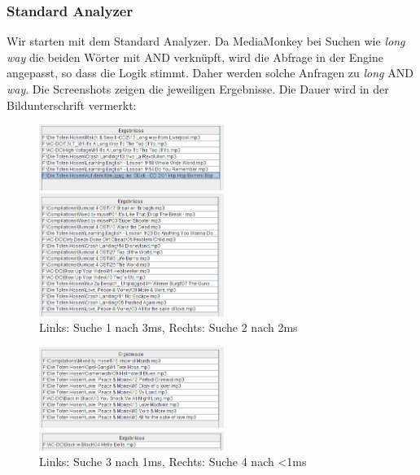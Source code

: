 \documentclass[12pt,a4paper,ngerman]{report}
\begin{document}
\subsubsection{Standard Analyzer}
Wir starten mit dem Standard Analyzer. Da MediaMonkey bei Suchen wie \textit{long way} die beiden Wörter mit AND verknüpft, wird die Abfrage in der Engine angepasst, so dass die Logik stimmt. Daher werden solche Anfragen zu \textit{long} AND \textit{way}. Die Screenshots zeigen die jeweiligen Ergebnisse. Die Dauer wird in der Bildunterschrift vermerkt:
\begin{figure}[h!]
\centering
	\begin{minipage}[b]{7cm}
	\includegraphics[width=6cm]{img/search1_stanAn_3MS.png}
	\end{minipage}
	\begin{minipage}[b]{7cm}
	\includegraphics[width=6cm]{img/search2_stanAn_2MS.png}
	\end{minipage}
\caption{Links: Suche 1 nach 3ms, Rechts: Suche 2 nach 2ms\protect\footnotemark}
\end{figure}
\begin{figure}[h!]
\centering
	\begin{minipage}[b]{7cm}
	\includegraphics[width=6cm]{img/search3_stanAn_1MS.png}
	\end{minipage}
	\begin{minipage}[b]{7cm}
	\includegraphics[width=6cm]{img/search4_stanAn_0MS.png}
	\end{minipage}
\caption{Links: Suche 3 nach 1ms, Rechts: Suche 4 nach \textless 1ms\protect\footnotemark}
\end{figure}
\end{document}
